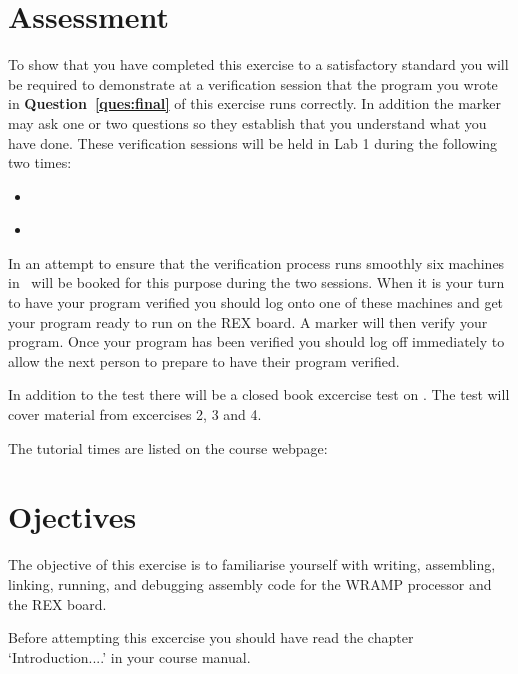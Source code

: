 \documentclass[a4paper,10pt]{article}
\begin{document}


\section{Assessment}
To show that you have completed this exercise to a satisfactory
standard you will be required to demonstrate at a verification session
that the program you wrote in \textbf{Question~\ref{ques:final}} 
of this exercise
runs correctly. In addition the marker may ask one or two questions so
they establish that you understand what you have done.  These
verification sessions will be held in Lab 1 during the following two
times:

\begin{itemize}
\item \INTRODUE~\MORNINGASSESS
\item \INTRODUE~\AFTERNOONASSESS 
\end{itemize}

In an attempt to ensure that the verification process runs smoothly
six machines in \ASSESSROOM\ will be booked for this purpose during the two
sessions. When it is your turn to have your program verified you
should log onto one of these machines and get your program ready to
run on the REX board. A marker will then verify your program. Once
your program has been verified you should log off immediately to allow
the next person to prepare to have their program verified.

In addition to the test there will be a closed book excercise test on
\textbf{\CWRAMPTEST}.  The test will cover material 
from excercises 2, 3 and 4.

The tutorial times are listed on the course webpage:

\begin{center}
\src{\WEBPAGEBASE}
\end{center}

\section{Ojectives}
The objective of this exercise is to familiarise 
yourself with writing, assembling, linking, running, and
debugging assembly code for the WRAMP processor and the REX board.

Before attempting this excercise you should have read the 
chapter `Introduction....' in your course manual.
\end{document}
